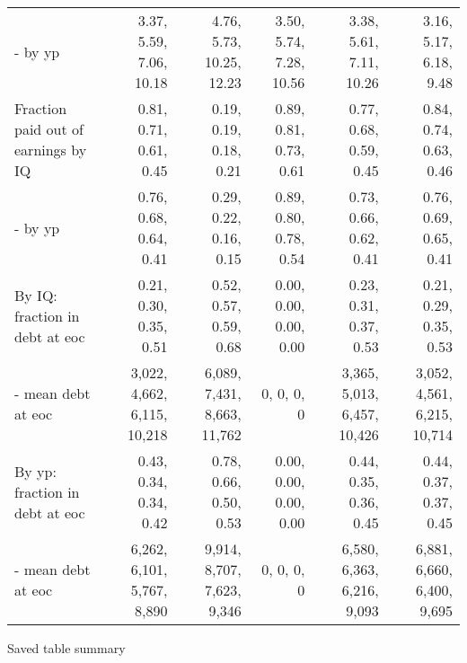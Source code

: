 \begin{tabular}{lrrrrr}
- by yp & 3.37, 5.59, 7.06, 10.18  & 4.76, 5.73, 10.25, 12.23  & 3.50, 5.74, 7.28, 10.56  & 3.38, 5.61, 7.11, 10.26  & 3.16, 5.17, 6.18, 9.48  \\ 
Fraction paid out of earnings by IQ & 0.81, 0.71, 0.61, 0.45  & 0.19, 0.19, 0.18, 0.21  & 0.89, 0.81, 0.73, 0.61  & 0.77, 0.68, 0.59, 0.45  & 0.84, 0.74, 0.63, 0.46  \\ 
- by yp & 0.76, 0.68, 0.64, 0.41  & 0.29, 0.22, 0.16, 0.15  & 0.89, 0.80, 0.78, 0.54  & 0.73, 0.66, 0.62, 0.41  & 0.76, 0.69, 0.65, 0.41  \\ 
By IQ: fraction in debt at eoc & 0.21, 0.30, 0.35, 0.51  & 0.52, 0.57, 0.59, 0.68  & 0.00, 0.00, 0.00, 0.00  & 0.23, 0.31, 0.37, 0.53  & 0.21, 0.29, 0.35, 0.53  \\ 
- mean debt at eoc & 3,022, 4,662, 6,115, 10,218  & 6,089, 7,431, 8,663, 11,762  & 0, 0, 0, 0  & 3,365, 5,013, 6,457, 10,426  & 3,052, 4,561, 6,215, 10,714  \\ 
By yp: fraction in debt at eoc & 0.43, 0.34, 0.34, 0.42  & 0.78, 0.66, 0.50, 0.53  & 0.00, 0.00, 0.00, 0.00  & 0.44, 0.35, 0.36, 0.45  & 0.44, 0.37, 0.37, 0.45  \\ 
- mean debt at eoc & 6,262, 6,101, 5,767, 8,890  & 9,914, 8,707, 7,623, 9,346  & 0, 0, 0, 0  & 6,580, 6,363, 6,216, 9,093  & 6,881, 6,660, 6,400, 9,695  \\ 
\hline
\end{tabular}%
Saved table summary

